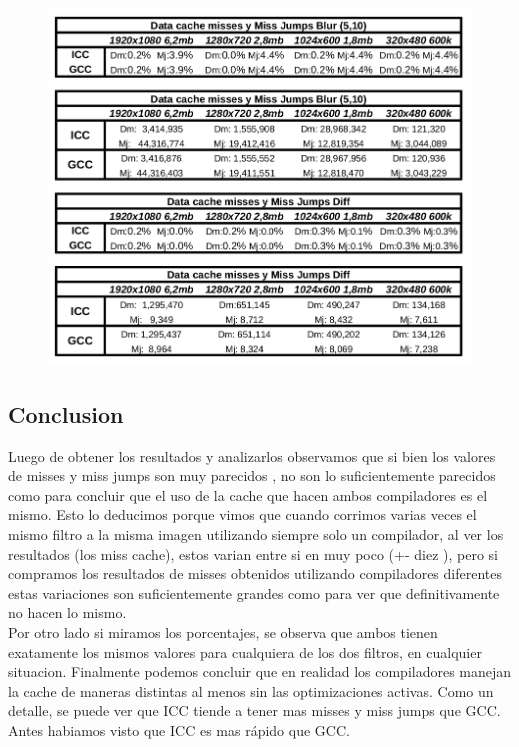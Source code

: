 \begin{figure}[H]
\begin{center}
  \includegraphics[width=\linewidth]{cachecompiladores/tabla.png}
\end{center}
\end{figure}

\subsection{Conclusion}

Luego de obtener los resultados y analizarlos observamos que si bien los valores de misses y miss jumps son muy parecidos , no son lo suficientemente parecidos como para concluir que el uso de la cache que hacen ambos compiladores es el mismo. Esto lo deducimos porque vimos que cuando corrimos varias veces el mismo filtro a la misma imagen utilizando siempre solo un compilador, al ver los resultados (los miss cache), estos varian entre si en muy poco (+- diez ), pero si compramos los resultados de misses obtenidos utilizando compiladores diferentes estas variaciones son suficientemente grandes como para ver que definitivamente no hacen lo mismo. \\

Por otro lado si miramos los porcentajes, se observa que ambos tienen exatamente los mismos valores para cualquiera de los dos filtros, en cualquier situacion. Finalmente podemos concluir que en realidad los compiladores manejan la cache de maneras distintas al menos sin las optimizaciones activas. Como un detalle, se puede ver que ICC tiende a tener mas misses y miss jumps que GCC. Antes habiamos visto que ICC es mas rápido que GCC.


